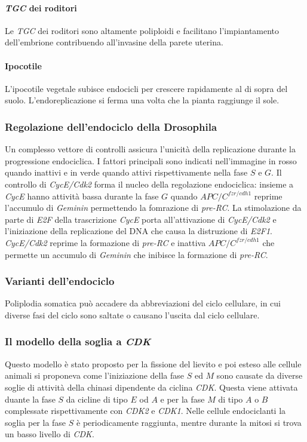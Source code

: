 \paragraph{\emph{TGC} dei roditori}
Le \emph{TGC} dei roditori sono altamente poliploidi e facilitano l'impiantamento dell'embrione contribuendo all'invasine della parete uterina. 
\paragraph{Ipocotile}
L'ipocotile vegetale subisce endocicli per crescere rapidamente al di sopra del suolo. L'endoreplicazione si ferma una volta che la pianta raggiunge il sole. 
\subsubsection{Regolazione dell'endociclo della Drosophila}
Un complesso vettore di controlli assicura l'unicit\`a della replicazione durante la progressione endociclica. I fattori principali sono indicati nell'immagine in rosso quando inattivi 
e in verde quando attivi rispettivamente nella fase $S$ e $G$. Il controllo di \emph{CycE/Cdk2} forma il nucleo della regolazione endociclica: insieme a \emph{CycE}  hanno attivit\`a
bassa durante la fase $G$ quando $APC/C^{fzr/cdh1}$ reprime l'accumulo di \emph{Geminin} permettendo la fomrazione di \emph{pre-RC}. La stimolazione da parte di \emph{E2F} della 
trascrizione \emph{CycE} porta all'attivazione di \emph{CycE/Cdk2} e l'iniziazione della replicazione del DNA che causa la distruzione di \emph{E2F1}. \emph{CycE/Cdk2} reprime la 
formazione di \emph{pre-RC} e inattiva $APC/C^{fzr/cdh1}$ che permette un accumulo di \emph{Geminin} che inibisce la formazione di \emph{pre-RC}. 
\subsubsection{Varianti dell'endociclo}
Poliplodia somatica pu\`o accadere da abbreviazioni del ciclo cellulare, in cui diverse fasi del ciclo sono saltate o causano l'uscita dal ciclo cellulare. 
\subsubsection{Il modello della soglia a \emph{CDK}}
Questo modello \`e stato proposto per la fissione del lievito e poi esteso alle cellule animali si proponeva come l'iniziazione della fase $S$ ed $M$ sono causate da diverse soglie di
attivit\`a della chinasi dipendente da ciclina \emph{CDK}. Questa viene attivata duante la fase $S$ da cicline di tipo $E$ od $A$ e per la fase $M$ di tipo $A$ o $B$ complessate
rispettivamente con \emph{CDK2} e \emph{CDK1}. Nelle cellule endociclanti la soglia per la fase $S$ \`e periodicamente raggiunta, mentre durante la mitosi si trova un basso livello di
\emph{CDK}.
